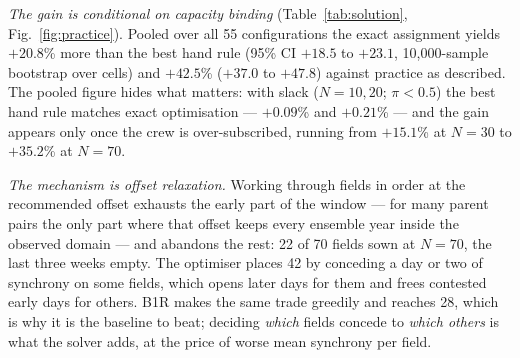 \documentclass[10pt,twocolumn]{article}
\begin{document}
\emph{The gain is conditional on capacity binding}
(Table~\ref{tab:solution}, Fig.~\ref{fig:practice}). Pooled over all 55
configurations the exact assignment yields $+20.8$\% more than the best hand
rule (95\% CI $+18.5$ to $+23.1$, 10{,}000-sample bootstrap over cells) and
$+42.5$\% ($+37.0$ to $+47.8$) against practice as described. The pooled
figure hides what matters: with slack ($N = 10, 20$; $\pi < 0.5$) the best
hand rule matches exact optimisation --- $+0.09$\% and $+0.21$\% --- and the
gain appears only once the crew is over-subscribed, running from $+15.1$\%
at $N = 30$ to $+35.2$\% at $N = 70$.

\emph{The mechanism is offset relaxation.} Working through fields in order
at the recommended offset exhausts the early part of the window --- for many
parent pairs the only part where that offset keeps every ensemble year
inside the observed domain --- and abandons the rest: 22 of 70 fields sown
at $N = 70$, the last three weeks empty. The optimiser places 42 by
conceding a day or two of synchrony on some fields, which opens later days
for them and frees contested early days for others. B1R makes the same trade
greedily and reaches 28, which is why it is the baseline to beat; deciding
\emph{which} fields concede to \emph{which others} is what the solver adds,
at the price of worse mean synchrony per field.
\end{document}

